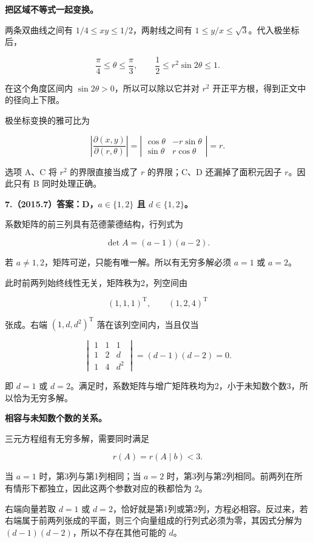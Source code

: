 \documentclass[UTF8,11pt,fontset=windows]{ctexart}
\begin{document}
\textbf{把区域不等式一起变换。}

两条双曲线之间有 $1/4\le xy\le1/2$，两射线之间有 $1\le y/x\le\sqrt3$。代入极坐标后，

$$
\frac\pi4\le\theta\le\frac\pi3,
\qquad
\frac12\le r^2\sin2\theta\le1.
$$

在这个角度区间内 $\sin2\theta>0$，所以可以除以它并对 $r^2$ 开正平方根，得到正文中的径向上下限。

极坐标变换的雅可比为

$$
\left|\frac{\partial(x,y)}{\partial(r,\theta)}\right|
=\left|\begin{matrix}\cos\theta&-r\sin\theta\\\sin\theta&r\cos\theta\end{matrix}\right|=r.
$$

选项 A、C 将 $r^2$ 的界限直接当成了 $r$ 的界限；C、D 还漏掉了面积元因子 $r$。因此只有 B 同时处理正确。

\clearpage

\textbf{7.（2015.7）答案：D，$a\in\{1,2\}$ 且 $d\in\{1,2\}$。}

系数矩阵的前三列具有范德蒙德结构，行列式为

$$
\det A=(a-1)(a-2).
$$

若 $a\ne1,2$，矩阵可逆，只能有唯一解。所以有无穷多解必须 $a=1$ 或 $a=2$。

此时前两列始终线性无关，矩阵秩为2，列空间由

$$
(1,1,1)^{\mathrm T},\qquad (1,2,4)^{\mathrm T}
$$

张成。右端 $(1,d,d^2)^{\mathrm T}$ 落在该列空间内，当且仅当

$$
\begin{vmatrix}1&1&1\\1&2&d\\1&4&d^2\end{vmatrix}
=(d-1)(d-2)=0.
$$

即 $d=1$ 或 $d=2$。满足时，系数矩阵与增广矩阵秩均为2，小于未知数个数3，所以恰为无穷多解。

\textbf{相容与未知数个数的关系。}

三元方程组有无穷多解，需要同时满足

$$
r(A)=r(A\mid b)<3.
$$

当 $a=1$ 时，第3列与第1列相同；当 $a=2$ 时，第3列与第2列相同。前两列在所有情形下都独立，因此这两个参数对应的秩都恰为 $2$。

右端向量若取 $d=1$ 或 $d=2$，恰好就是第1列或第2列，方程必相容。反过来，若右端属于前两列张成的平面，则三个向量组成的行列式必须为零，其因式分解为 $(d-1)(d-2)$，所以不存在其他可能的 $d$。
\end{document}
